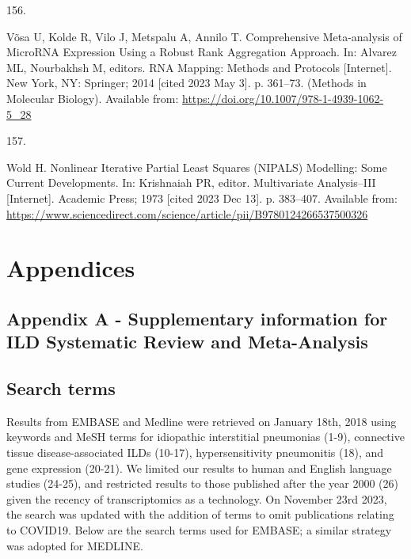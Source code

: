 \documentclass[
]{article}
\newlength{\cslhangindent}
\newlength{\csllabelwidth}
\newenvironment{CSLReferences}[2] %
 {\begin{list}{}{%
  \setlength{\itemindent}{0pt}
  \setlength{\leftmargin}{0pt}
  \setlength{\parsep}{0pt}
  \ifodd #1
   \setlength{\leftmargin}{\cslhangindent}
   \setlength{\itemindent}{-1\cslhangindent}
  \fi
  \setlength{\itemsep}{#2\baselineskip}}}
 {\end{list}}
\newcommand{\CSLLeftMargin}[1]{\parbox[t]{\csllabelwidth}{\strut#1\strut}}
\newcommand{\CSLRightInline}[1]{\parbox[t]{\linewidth - \csllabelwidth}{\strut#1\strut}}
\begin{document}
\begin{CSLReferences}{0}{1}
\CSLLeftMargin{156. }%
\CSLRightInline{Võsa U, Kolde R, Vilo J, Metspalu A, Annilo T. Comprehensive {Meta}-analysis of {MicroRNA} {Expression} {Using} a {Robust} {Rank} {Aggregation} {Approach}. In: Alvarez ML, Nourbakhsh M, editors. {RNA} {Mapping}: {Methods} and {Protocols} {[}Internet{]}. New York, NY: Springer; 2014 {[}cited 2023 May 3{]}. p. 361--73. (Methods in {Molecular} {Biology}). Available from: \url{https://doi.org/10.1007/978-1-4939-1062-5_28}}

\CSLLeftMargin{157. }%
\CSLRightInline{Wold H. Nonlinear {Iterative} {Partial} {Least} {Squares} ({NIPALS}) {Modelling}: {Some} {Current} {Developments}. In: Krishnaiah PR, editor. Multivariate {Analysis}--{III} {[}Internet{]}. Academic Press; 1973 {[}cited 2023 Dec 13{]}. p. 383--407. Available from: \url{https://www.sciencedirect.com/science/article/pii/B9780124266537500326}}

\end{CSLReferences}

\clearpage

\setlength{\parindent}{4em} 
\linespread{1}
\doublespacing

\section*{Appendices}

\setcounter{secnumdepth}{0}

\subsection{Appendix A - Supplementary information for ILD Systematic Review and Meta-Analysis}\label{appendix-a---supplementary-information-for-ild-systematic-review-and-meta-analysis}

\renewcommand{\thefigure}{A2.\arabic{figure}}
\setcounter{figure}{0}
\renewcommand{\thetable}{A2.\arabic{table}}
\setcounter{table}{0}
\renewcommand{\theequation}{A2.\arabic{equation}}
\setcounter{equation}{0}

\subsection{Search terms}\label{search-terms}

Results from EMBASE and Medline were retrieved on January 18th, 2018 using keywords and MeSH terms for idiopathic interstitial pneumonias (1-9), connective tissue disease-associated ILDs (10-17), hypersensitivity pneumonitis (18), and gene expression (20-21). We limited our results to human and English language studies (24-25), and restricted results to those published after the year 2000 (26) given the recency of transcriptomics as a technology. On November 23rd 2023, the search was updated with the addition of terms to omit publications relating to COVID19. Below are the search terms used for EMBASE; a similar strategy was adopted for MEDLINE.
\end{document}
